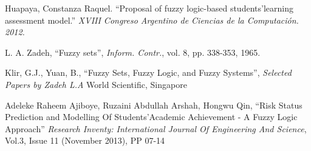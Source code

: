 \documentclass[conference]{IEEEtran}
\newcommand{\quotes}[1]{``#1''}
\begin{document}
\begin{thebibliography}{11}
Huapaya, Constanza Raquel. \quotes{Proposal of fuzzy logic-based students\rq learning assessment model.} \emph{XVIII Congreso Argentino de Ciencias de la Computación. 2012.}


L. A. Zadeh, \quotes{Fuzzy sets}, \emph{Inform. Contr.}, vol. 8, pp. 338-353, 1965.

Klir, G.J., Yuan, B., \quotes{Fuzzy Sets, Fuzzy Logic, and Fuzzy Systems}, \emph{Selected Papers by Zadeh L.A} World Scientific, Singapore 

Adeleke Raheem Ajiboye, Ruzaini Abdullah Arshah, Hongwu Qin, \quotes{Risk Status Prediction and Modelling Of Students\rq Academic Achievement - A Fuzzy Logic Approach} \emph{Research Inventy: International Journal Of Engineering And Science}, Vol.3, Issue 11 (November 2013), PP 07-14



\end{thebibliography}

% 







\end{document}

